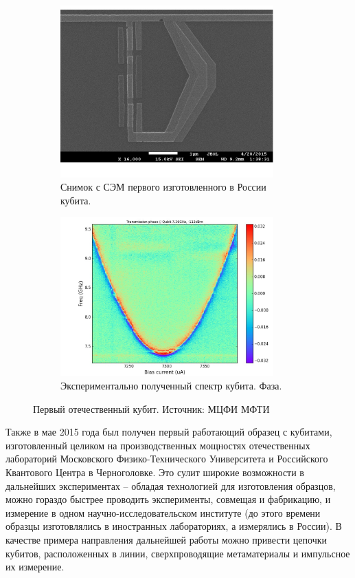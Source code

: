 \documentclass[12pt, twoside]{report}
\numberwithin{equation}{section}
\numberwithin{figure}{section}
\begin{document}
\begin{figure}[h]
\centering
\begin{subfigure}[t]{0.45\textwidth}
\includegraphics[width=0.9\textwidth]{Pictures/new_qubit}
\caption{Снимок с СЭМ первого изготовленного в России кубита.}
\end{subfigure}
\begin{subfigure}[t]{0.5\textwidth}
\includegraphics[width=0.9\textwidth]{Pictures/new_spectrum}
\caption{Экспериментально полученный спектр кубита. Фаза.}
\end{subfigure}
\caption{Первый отечественный кубит. Источник: МЦФИ МФТИ}
\end{figure}

Также в мае 2015 года был получен первый работающий образец с кубитами, изготовленный целиком на производственных мощностях отечественных лабораторий Московского Физико-Технического Университета и Российского Квантового Центра в Черноголовке. Это сулит широкие возможности в дальнейших экспериментах -- обладая технологией для изготовления образцов, можно гораздо быстрее проводить эксперименты, совмещая и фабрикацию, и измерение в одном научно-исследовательском институте (до этого времени образцы изготовлялись в иностранных лабораториях, а измерялись в России). В качестве примера направления дальнейшей работы можно привести цепочки кубитов, расположенных в линии, сверхпроводящие метаматериалы и импульсное их измерение.
\end{document}
